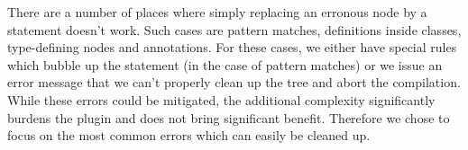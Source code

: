 There are a number of places where simply replacing an erronous node by a statement doesn't work. Such cases are pattern matches, definitions inside classes, type-defining nodes and annotations. For these cases, we either have special rules which bubble up the statement (in the case of pattern matches) or we issue an error message that we can't properly clean up the tree and abort the compilation. While these errors could be mitigated, the additional complexity significantly burdens the plugin and does not bring significant benefit. Therefore we chose to focus on the most common errors which can easily be cleaned up.


